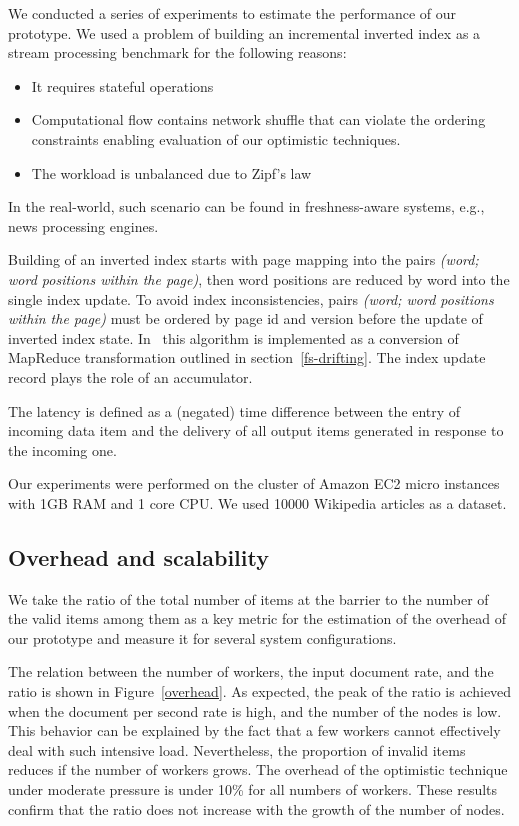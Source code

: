 \label{fs-experiments-section}

We conducted a  series of experiments to estimate the performance of our prototype. We used a problem of building an incremental inverted index as a stream processing benchmark  for the following reasons:

\begin{itemize}
  \item It requires stateful operations
  \item Computational flow contains network shuffle that can violate the ordering constraints enabling evaluation of our optimistic techniques.
  \item The workload is unbalanced due to Zipf's law
\end{itemize}

In the real-world, such scenario can be found in freshness-aware systems, e.g., news processing engines.

Building of an inverted index starts with page mapping into the pairs {\it (word; word positions within the page)}, then  word positions are reduced by word into the single index update. To avoid index inconsistencies, pairs {\it (word; word positions within the page)} must be ordered by page id and version before the update of inverted index state. In \FlameStream\ this algorithm is implemented as a conversion of MapReduce transformation outlined in  section~\ref{fs-drifting}. The index update record plays the role of an accumulator. 

The latency is defined as a (negated) time difference between the entry of incoming data item and the delivery of all output items generated in response to the incoming one.

Our experiments were performed on the cluster of Amazon EC2 micro instances with 1GB RAM and 1 core CPU. We used 10000 Wikipedia articles as a dataset. 

\subsection{Overhead and scalability}

We take the ratio of  the total number of items at the barrier   to the number of the valid items among them as a key metric for the estimation of the overhead of our prototype and measure it for several system configurations.

The relation between the number of workers, the input  document  rate, and the  ratio is shown in Figure~\ref{overhead}. As expected, the peak of the ratio is achieved when the document per second rate is high, and the number of the nodes is low. This behavior can be explained by the fact that a few workers cannot effectively deal with such intensive load. Nevertheless, the proportion of invalid items reduces if the number of workers grows. The overhead of the optimistic technique under moderate pressure  is under 10\% for all  numbers of workers. These results confirm that the ratio does not increase with the growth of the number of nodes.

